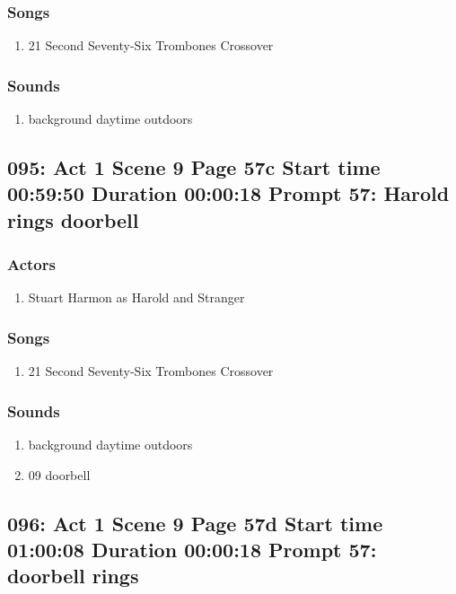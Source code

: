 \subsubsection{Songs}
\begin{enumerate}
\item 21 Second Seventy-Six Trombones Crossover
\end{enumerate}\subsubsection{Sounds}
\begin{enumerate}
\item background daytime outdoors
\end{enumerate}
\subsection{095: Act 1 Scene 9 Page 57c Start time 00:59:50 Duration 00:00:18 Prompt 57: Harold rings doorbell}

\subsubsection{Actors}
\begin{enumerate}
\item Stuart Harmon as Harold and Stranger
\end{enumerate}

\subsubsection{Songs}
\begin{enumerate}
\item 21 Second Seventy-Six Trombones Crossover
\end{enumerate}\subsubsection{Sounds}
\begin{enumerate}
\item background daytime outdoors
\item 09 doorbell
\end{enumerate}
\subsection{096: Act 1 Scene 9 Page 57d Start time 01:00:08 Duration 00:00:18 Prompt 57: doorbell rings}

